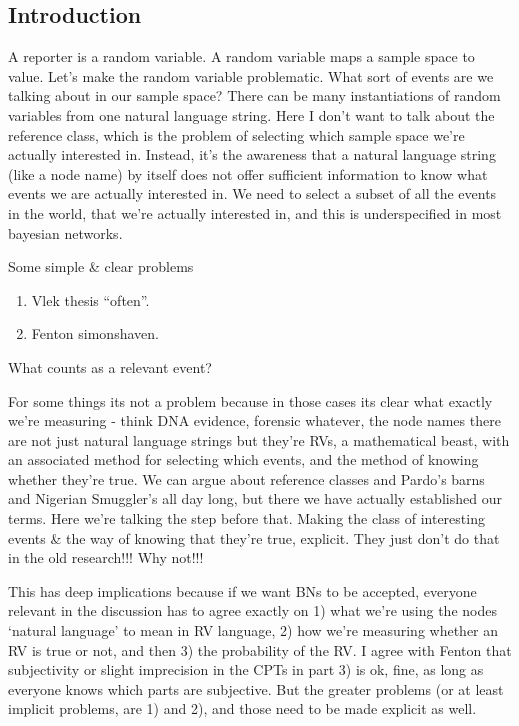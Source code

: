 \subsection{Introduction}
A reporter is a random variable. A random variable maps a sample space to value. Let's make the random variable problematic. What sort of events are we talking about in our sample space? There can be many instantiations of random variables from one natural language string. Here I don't want to talk about the reference class, which is the problem of selecting which sample space we're actually interested in. Instead, it's the awareness that a natural language string (like a node name) by itself does not offer sufficient information to know what events we are actually interested in. We need to select a subset of all the events in the world, that we're actually interested in, and this is underspecified in most bayesian networks.

Some simple \& clear problems

\begin{enumerate}
\item Vlek thesis ``often''. 
\item Fenton simonshaven.
\end{enumerate}

What counts as a relevant event?

For some things its not a problem because in those cases its clear what exactly we're measuring - think DNA evidence, forensic whatever, the node names there are not just natural language strings but they're RVs, a mathematical beast, with an associated method for selecting which events, and the method of knowing whether they're true. We can argue about reference classes and Pardo's barns and Nigerian Smuggler's all day long, but there we have actually established our terms. Here we're talking the step before that. Making the class of interesting events \& the way of knowing that they're true, explicit. They just don't do that in the old research!!! Why not!!!

This has deep implications because if we want BNs to be accepted, everyone relevant in the discussion has to agree exactly on 1) what we're using the nodes `natural language' to mean in RV language, 2) how we're measuring whether an RV is true or not, and then 3) the probability of the RV. I agree with Fenton that subjectivity or slight imprecision in the CPTs in part 3) is ok, fine, as long as everyone knows which parts are subjective. But the greater problems (or at least implicit problems, are 1) and 2), and those need to be made explicit as well.

